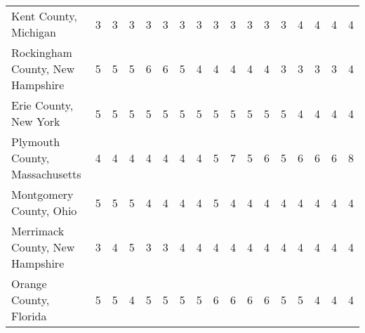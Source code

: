 \begin{landscape}
\begin{longtable}{lcccccccccccccccc}
Kent County, Michigan & 3 & 3 & 3 & 3 & 3 & 3 & 3 & 3 & 3 & 3 & 3 & 3 & 4 & 4 & 4 & 4 \\
Rockingham County, New Hampshire & 5 & 5 & 5 & 6 & 6 & 5 & 4 & 4 & 4 & 4 & 4 & 3 & 3 & 3 & 3 & 4 \\
Erie County, New York & 5 & 5 & 5 & 5 & 5 & 5 & 5 & 5 & 5 & 5 & 5 & 5 & 4 & 4 & 4 & 4 \\
Plymouth County, Massachusetts & 4 & 4 & 4 & 4 & 4 & 4 & 4 & 5 & 7 & 5 & 6 & 5 & 6 & 6 & 6 & 8 \\
Montgomery County, Ohio & 5 & 5 & 5 & 4 & 4 & 4 & 4 & 5 & 4 & 4 & 4 & 4 & 4 & 4 & 4 & 4 \\
Merrimack County, New Hampshire & 3 & 4 & 5 & 3 & 3 & 4 & 4 & 4 & 4 & 4 & 4 & 4 & 4 & 4 & 4 & 4 \\
Orange County, Florida & 5 & 5 & 4 & 5 & 5 & 5 & 5 & 6 & 6 & 6 & 6 & 5 & 5 & 4 & 4 & 4
\end{longtable}

\newpage


\end{landscape}
